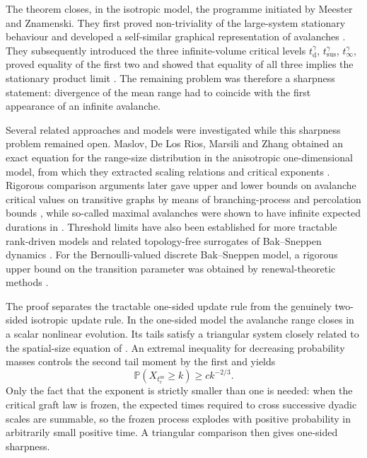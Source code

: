 \documentclass[11pt,a4paper]{amsart}
\theoremstyle{remark}
\begin{document}
The theorem closes, in the isotropic model, the programme initiated by
Meester and Znamenski. They first proved non-triviality of the large-system
stationary behaviour and developed a self-similar graphical representation
of avalanches \cite{MZ03}. They subsequently introduced the three
infinite-volume critical levels $t_{\mathrm d}^\gamma$, $t_{\mathrm{sus}}^\gamma$, 
        $t_\infty^\gamma$, proved equality of the first two and showed
that equality of all three implies the stationary product limit \cite{MZ04}. The
remaining problem was therefore a sharpness statement: divergence of the
mean range had to coincide with the first appearance of an infinite
avalanche.

Several related approaches and models were investigated while this
sharpness problem remained open. 
Maslov, De Los Rios, Marsili and Zhang 
obtained an exact equation for the range-size distribution in the anisotropic
one-dimensional model, from which they extracted scaling relations and
critical exponents \cite{MDRMZ98}.
Rigorous comparison
arguments later gave upper and lower bounds on avalanche critical values on
transitive graphs by means of branching-process and percolation bounds
\cite{GMN06}, while so-called
maximal avalanches were shown to have
infinite expected durations in \cite{GMW06}.
Threshold limits have also been established for more tractable rank-driven
models and related topology-free surrogates of Bak--Sneppen dynamics
\cite{GKW11,GKW12}. For the Bernoulli-valued discrete Bak--Sneppen model,
a rigorous upper bound on the transition parameter was obtained by
renewal-theoretic methods \cite{Volkov22}. 

The proof separates the tractable one-sided update rule from the genuinely
two-sided isotropic update rule. In the one-sided model the avalanche range
closes in a scalar nonlinear evolution. Its tails satisfy a triangular
system closely related to the spatial-size equation of \cite{MDRMZ98}. An extremal inequality for decreasing probability masses controls the
second tail moment by the first and yields
\[
        \mathbb P(X_{t_c^{\mathrm{os}}}\geq k)
        \geq ck^{-2/3}.
\]
Only the fact that the exponent is strictly smaller than one is needed:
when the critical graft law is frozen, the expected times required to cross
successive dyadic scales are summable, so the frozen process explodes with positive probability in
arbitrarily small positive time. 
A triangular comparison then gives
one-sided sharpness.
\end{document}
